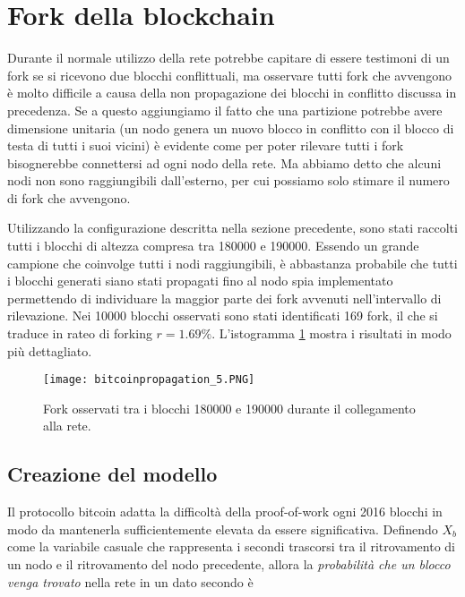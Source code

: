 \section{Fork della blockchain}\label{fork-della-blockchain}

Durante il normale utilizzo della rete potrebbe capitare di essere testimoni di un fork se si ricevono due blocchi conflittuali, ma osservare tutti fork che avvengono è molto difficile a causa della non propagazione dei blocchi in conflitto discussa in precedenza. Se a questo aggiungiamo il fatto che una partizione potrebbe avere dimensione unitaria (un nodo genera un nuovo blocco in conflitto con il blocco di testa di tutti i suoi vicini) è evidente come per poter rilevare tutti i fork bisognerebbe connettersi ad ogni nodo della rete. Ma abbiamo detto che alcuni nodi non sono raggiungibili dall'esterno, per cui possiamo solo stimare il numero di fork che avvengono.

Utilizzando la configurazione descritta nella sezione precedente, sono stati raccolti tutti i blocchi di altezza compresa tra 180000 e 190000. Essendo un grande campione che coinvolge tutti i nodi raggiungibili, è abbastanza probabile che tutti i blocchi generati siano stati propagati fino al nodo spia implementato permettendo di individuare la maggior parte dei fork avvenuti nell'intervallo di rilevazione. Nei 10000 blocchi osservati sono stati identificati 169 fork, il che si traduce in rateo di forking $r = 1.69\%$. L'istogramma \ref{bitcoinpropagation_5} mostra i risultati in modo più dettagliato.

\begin{figure}[htbp]
\centering
\texttt{[image: bitcoinpropagation\_5.PNG]}
\caption[Fork nella Blockchain]{Fork osservati tra i blocchi 180000 e 190000 durante il collegamento alla rete.\label{bitcoinpropagation_5}}
\end{figure}

\subsection{Creazione del modello}\label{creazione-del-modello}

Il protocollo bitcoin adatta la difficoltà della proof-of-work ogni 2016 blocchi in modo da mantenerla sufficientemente elevata da essere significativa. Definendo $X_b$ come la variabile casuale che rappresenta i secondi trascorsi tra il ritrovamento di un nodo e il ritrovamento del nodo precedente, allora la \emph{probabilità che un blocco venga trovato} nella rete in un dato secondo è


